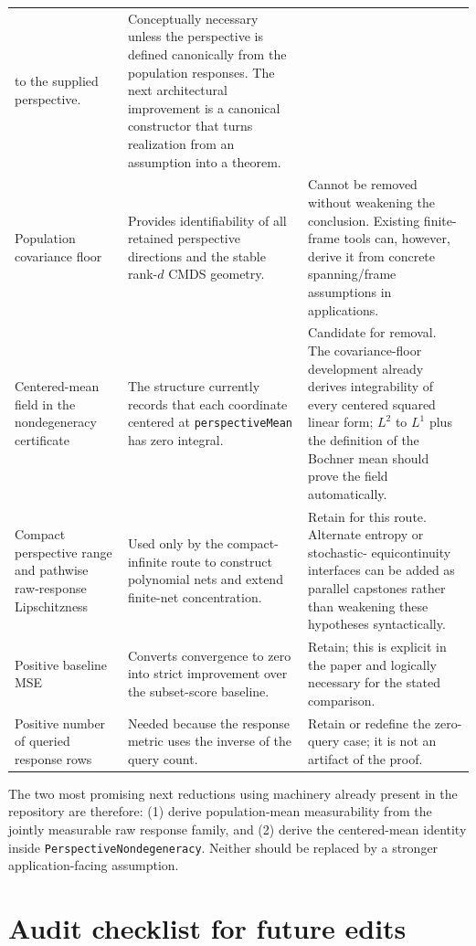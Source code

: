 \documentclass[11pt]{article}
\newcommand{\code}[1]{\texttt{#1}}
\begin{document}
\begin{longtable}{>{\raggedright\arraybackslash}p{}
                  >{\raggedright\arraybackslash}p{}
                  >{\raggedright\arraybackslash}p{}}
to the supplied perspective. & Conceptually necessary unless the perspective
is defined canonically from the population responses.  The next architectural
improvement is a canonical constructor that turns realization from an
assumption into a theorem. \\
\addlinespace
Population covariance floor & Provides identifiability of all retained
perspective directions and the stable rank-$d$ CMDS geometry. & Cannot be
removed without weakening the conclusion.  Existing finite-frame tools can,
however, derive it from concrete spanning/frame assumptions in applications.
\\
\addlinespace
Centered-mean field in the nondegeneracy certificate & The structure
currently records that each coordinate centered at \code{perspectiveMean} has
zero integral. & Candidate for removal.  The covariance-floor development
already derives integrability of every centered squared linear form; $L^2$ to
$L^1$ plus the definition of the Bochner mean should prove the field
automatically. \\
\addlinespace
Compact perspective range and pathwise raw-response Lipschitzness & Used only by
the compact-infinite route to construct polynomial nets and extend finite-net
concentration. & Retain for this route.  Alternate entropy or stochastic-
equicontinuity interfaces can be added as parallel capstones rather than
weakening these hypotheses syntactically. \\
\addlinespace
Positive baseline MSE & Converts convergence to zero into strict improvement
over the subset-score baseline. & Retain; this is explicit in the paper and
logically necessary for the stated comparison. \\
\addlinespace
Positive number of queried response rows & Needed because the response metric
uses the inverse of the query count. & Retain or redefine the zero-query case;
it is not an artifact of the proof. \\
\bottomrule
\end{longtable}

The two most promising next reductions using machinery already present in the
repository are therefore: (1) derive population-mean measurability from the
jointly measurable raw response family, and (2) derive the centered-mean
identity inside \code{PerspectiveNondegeneracy}.  Neither should be replaced by
a stronger application-facing assumption.

\section{Audit checklist for future edits}
\end{document}
